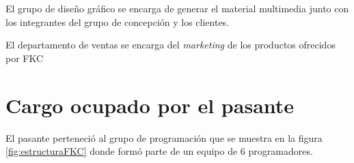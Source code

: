 El grupo de diseño gráfico se encarga de generar el material multimedia junto con los integrantes del grupo de concepción y los clientes. 

El departamento de ventas se encarga del \emph{marketing} de los productos ofrecidos por \gls{FKC}

\section{Cargo ocupado por el pasante} 

El pasante perteneció al grupo de programación que se muestra en la figura \ref{fig:estructuraFKC} donde formó parte de un equipo de 6 programadores.



